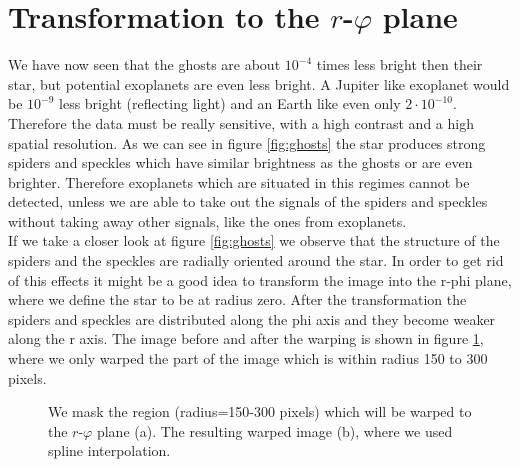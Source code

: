 \section{Transformation to the $r$-$\varphi$ plane}
We have now seen that the ghosts are about $10^{-4}$ times less bright then their star, but potential exoplanets are even less bright. A Jupiter like exoplanet would be $10^{-9}$ less bright (reflecting light) and an Earth like even only $2 \cdot 10^{-10}$. Therefore the data must be really sensitive, with a high contrast and a high spatial resolution. As we can see in figure \ref{fig:ghosts} the star produces strong spiders and speckles which have similar brightness as the ghosts or are even brighter. Therefore exoplanets which are situated in this regimes cannot be detected, unless we are able to take out the signals of the spiders and speckles without taking away other signals, like the ones from exoplanets.\\
If we take a closer look at figure \ref{fig:ghosts} we observe that the structure of the spiders and the speckles are radially oriented around the star. In order to get rid of this effects it might be a good idea to transform the image into the r-phi plane, where we define the star to be at radius zero. After the transformation the spiders and speckles are distributed along the phi axis and they become weaker along the r axis. The image before and after the warping is shown in figure \ref{fig:warping_R150-300}, where we only warped the part of the image which is within radius 150 to 300 pixels. \\
\begin{figure}[H]
	\centering
\caption{We mask the region (radius=150-300 pixels) which will be warped to the $r$-$\varphi$ plane (a). The resulting warped image (b), where we used spline interpolation.}
\label{fig:warping_R150-300}
\end{figure}
